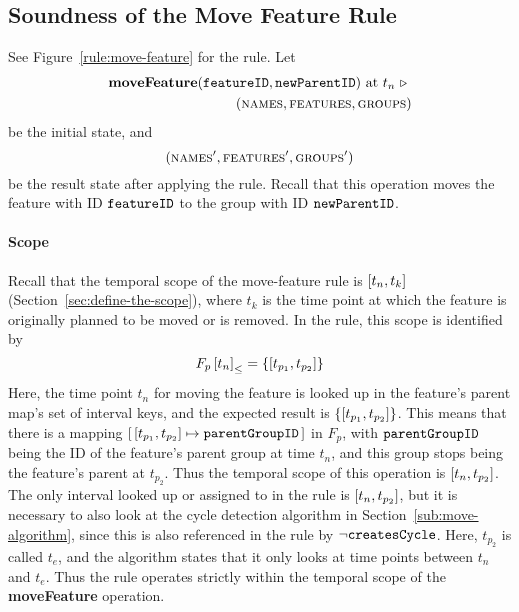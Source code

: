 \subsection{Soundness of the Move Feature Rule}
\label{sub:soundness-of-the-move-reature-rule}

See Figure~\vref{rule:move-feature} for the  rule. Let 
\begin{equation*}
   \begin{split}
      \textbf{moveFeature}(\texttt{featureID}, \texttt{newParentID}) \text{ at } t_n \ \triangleright \  \\
      (\textsc{names}, \textsc{features}, \textsc{groups}{})
   \end{split}
\end{equation*}
be the initial state, and
\[
   (\textsc{names}', \textsc{features}', \textsc{groups}{}')
\]
be the result state after applying the  rule. Recall that this operation moves the feature with ID $\texttt{featureID}$ to the group with ID $\texttt{newParentID}$.

\paragraph{Scope}
\label{par:scope}
Recall that the temporal scope of the move-feature rule is $\interval{t_n}{t_k}$ (Section~\vref{sec:define-the-scope}), where $t_k$ is the time point at which the feature is originally planned to be moved or is removed. In the rule, this scope is identified by 
   \[
      \containing{F_p}{t_n} = \set{\interval{t_{p_1}}{t_{p_2}}}
   \]
   Here, the time point $t_n$ for moving the feature is looked up in the feature's parent map's set of interval keys, and the expected result is $\set{\interval{t_{p_1}}{t_{p_2}}}$. This means that there is a mapping $\intervalmapping{t_{p_1}}{t_{p_2}}{\var{parentGroupID}}$ in $F_p$, with $\texttt{parentGroupID}$ being the ID of the feature's parent group at time $t_n$, and this group stops being the feature's parent at $t_{p_2}$. Thus the temporal scope of this operation is $\interval{t_n}{t_{p_2}}$. The only interval looked up or assigned to in the rule is $\interval{t_n}{t_{p_2}}$, but it is necessary to also look at the cycle detection algorithm in Section~\vref{sub:move-algorithm}, since this is also referenced in the rule by $\neg \texttt{createsCycle}$. Here, $t_{p_2}$ is called $t_e$, and the algorithm states that it only looks at time points between $t_n$ and $t_e$. Thus the rule operates strictly within the temporal scope of the \textbf{moveFeature} operation.

